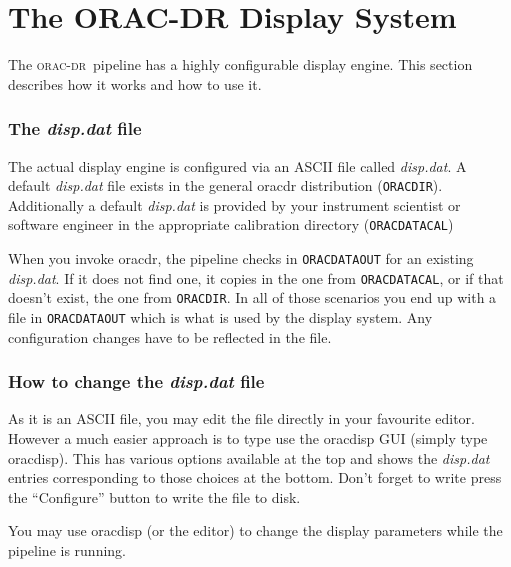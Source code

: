 \documentclass[twoside,11pt]{article}
\renewcommand{\_}{\texttt{\symbol{95}}}
\newcommand{\oracdr}{\textsc{orac-dr}}
\begin{document}
\section{The ORAC-DR Display System\label{The_ORAC-DR_Display_System}}

The \oracdr\ pipeline has a highly configurable display engine. This
section describes how it works and how to use it.

\subsubsection*{The \emph{disp.dat} file\label{The_ORAC-DR_Display_System_The_disp_dat_file}}

The actual display engine is configured via an ASCII file called
\emph{disp.dat}. A default \emph{disp.dat} file exists in the general oracdr
distribution (\texttt{ORAC\_DIR}). Additionally a default \emph{disp.dat} is provided
by your instrument scientist or software engineer in the appropriate
calibration directory (\texttt{ORAC\_DATA\_CAL})



When you invoke oracdr, the pipeline checks in \texttt{ORAC\_DATA\_OUT} for an
existing \emph{disp.dat}. If it does not find one, it copies in the one from
\texttt{ORAC\_DATA\_CAL}, or if that doesn't exist, the one from \texttt{ORAC\_DIR}. In
all of those scenarios you end up with a file in \texttt{ORAC\_DATA\_OUT} which
is what is used by the display system. Any configuration changes have
to be reflected in the file.

\subsubsection*{How to change the \emph{disp.dat} file\label{The_ORAC-DR_Display_System_How_to_change_the_disp_dat_file}}

As it is an ASCII file, you may edit the file directly in your
favourite editor. However a much easier approach is to type use the
oracdisp GUI (simply type oracdisp). This has various options
available at the top and shows the \emph{disp.dat} entries corresponding to
those choices at the bottom. Don't forget to write press the
``Configure'' button to write the file to disk.



You may use oracdisp (or the editor) to change the display parameters
while the pipeline is running.
\end{document}
